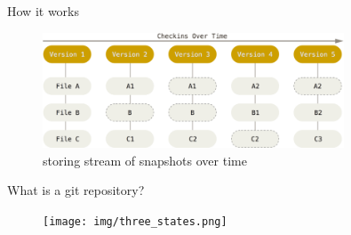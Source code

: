 \begin{frame}[fragile]{How it works}
    \begin{figure}
        \centering
        \includegraphics[width=0.8\textwidth]{img/snapshotbased.png}
        \caption{storing stream of snapshots over time}
    \end{figure}
\end{frame}


\begin{frame}{What is a git repository?}

    \begin{figure}
        \centering
        \texttt{[image: img/three\_states.png]}
    \end{figure}
\end{frame}



